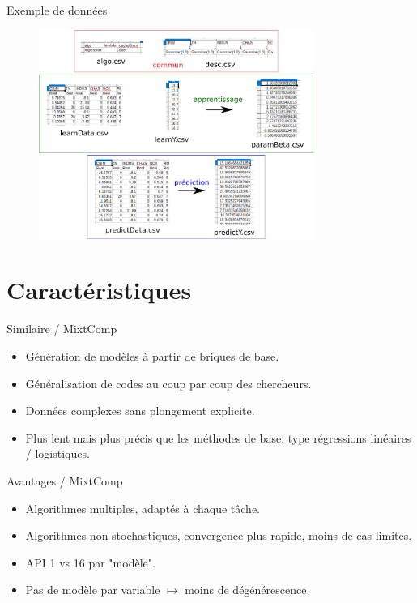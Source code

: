 \documentclass{beamer}
\begin{document}
\begin{frame}{Exemple de données}
\begin{figure}[t]
	\includegraphics[width=0.8\textwidth]{figures/data}
\end{figure}
\end{frame}

\section{Caractéristiques}

\begin{frame}{Similaire / MixtComp}
	\begin{itemize}
		\item Génération de modèles à partir de briques de base.
		\item Généralisation de codes au coup par coup des chercheurs.
		\item Données complexes sans plongement explicite.
		\item Plus lent mais plus précis que les méthodes de base, type régressions linéaires / logistiques.
	\end{itemize}
\end{frame}

\begin{frame}{Avantages / MixtComp}
	\begin{itemize}
		\item Algorithmes multiples, adaptés à chaque tâche.
		\item Algorithmes non stochastiques, convergence plus rapide, moins de cas limites.
		\item API 1 vs 16 par "modèle".
		\item Pas de modèle par variable $\mapsto$ moins de dégénérescence.
	\end{itemize}
\end{frame}
\end{document}
